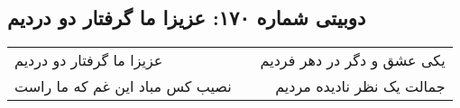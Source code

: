 \begin{center}
\section*{دوبیتی شماره ۱۷۰: عزیزا ما گرفتار دو دردیم}
\label{sec:170}
\begin{longtable}{l p{0.5cm} r}
عزیزا ما گرفتار دو دردیم
&&
یکی عشق و دگر در دهر فردیم
\\
نصیب کس مباد این غم که ما راست
&&
جمالت یک نظر نادیده مردیم
\\
\end{longtable}
\end{center}
